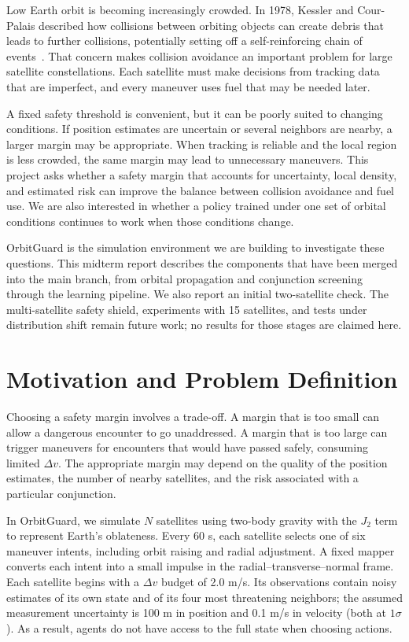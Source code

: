 \documentclass[conference]{IEEEtran}
\begin{document}
Low Earth orbit is becoming increasingly crowded. In 1978, Kessler and Cour-Palais described how collisions between orbiting objects can create debris that leads to further collisions, potentially setting off a self-reinforcing chain of events~\cite{kessler1978}. That concern makes collision avoidance an important problem for large satellite constellations. Each satellite must make decisions from tracking data that are imperfect, and every maneuver uses fuel that may be needed later.

A fixed safety threshold is convenient, but it can be poorly suited to changing conditions. If position estimates are uncertain or several neighbors are nearby, a larger margin may be appropriate. When tracking is reliable and the local region is less crowded, the same margin may lead to unnecessary maneuvers. This project asks whether a safety margin that accounts for uncertainty, local density, and estimated risk can improve the balance between collision avoidance and fuel use. We are also interested in whether a policy trained under one set of orbital conditions continues to work when those conditions change.

OrbitGuard is the simulation environment we are building to investigate these questions. This midterm report describes the components that have been merged into the main branch, from orbital propagation and conjunction screening through the learning pipeline. We also report an initial two-satellite check. The multi-satellite safety shield, experiments with 15 satellites, and tests under distribution shift remain future work; no results for those stages are claimed here.

\section{Motivation and Problem Definition}
\label{sec:problem}

Choosing a safety margin involves a trade-off. A margin that is too small can allow a dangerous encounter to go unaddressed. A margin that is too large can trigger maneuvers for encounters that would have passed safely, consuming limited $\Delta v$. The appropriate margin may depend on the quality of the position estimates, the number of nearby satellites, and the risk associated with a particular conjunction.

In OrbitGuard, we simulate $N$ satellites using two-body gravity with the $J_2$ term to represent Earth's oblateness. Every 60 s, each satellite selects one of six maneuver intents, including orbit raising and radial adjustment. A fixed mapper converts each intent into a small impulse in the radial--transverse--normal frame. Each satellite begins with a $\Delta v$ budget of 2.0 m/s. Its observations contain noisy estimates of its own state and of its four most threatening neighbors; the assumed measurement uncertainty is 100 m in position and 0.1 m/s in velocity (both at $1\sigma$). As a result, agents do not have access to the full state when choosing actions.
\end{document}

